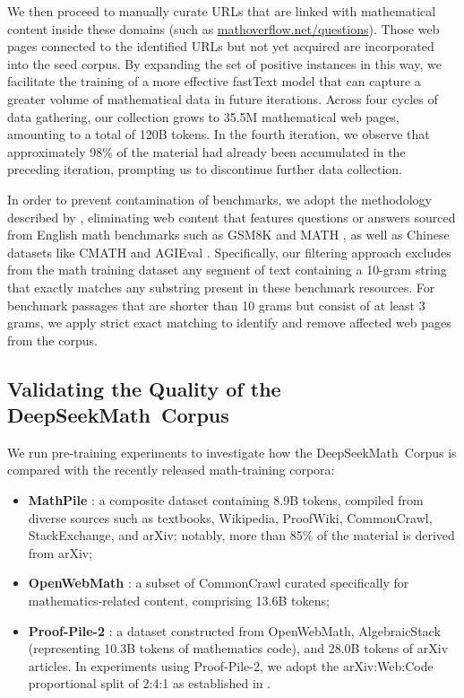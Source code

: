 \begin{itemize}[topsep=0pt]
We then proceed to manually curate URLs that are linked with mathematical content inside these domains (such as \url{mathoverflow.net/questions}). Those web pages connected to the identified URLs but not yet acquired are incorporated into the seed corpus. By expanding the set of positive instances in this way, we facilitate the training of a more effective fastText model that can capture a greater volume of mathematical data in future iterations. Across four cycles of data gathering, our collection grows to 35.5M mathematical web pages, amounting to a total of 120B tokens. In the fourth iteration, we observe that approximately 98\% of the material had already been accumulated in the preceding iteration, prompting us to discontinue further data collection.

In order to prevent contamination of benchmarks, we adopt the methodology described by \cite{deepseek-coder}, eliminating web content that features questions or answers sourced from English math benchmarks such as GSM8K \citep{gsm8k} and MATH \citep{MATH}, as well as Chinese datasets like CMATH \citep{wei2023cmath} and AGIEval \citep{agieval}. Specifically, our filtering approach excludes from the math training dataset any segment of text containing a 10-gram string that exactly matches any substring present in these benchmark resources. For benchmark passages that are shorter than 10 grams but consist of at least 3 grams, we apply strict exact matching to identify and remove affected web pages from the corpus.

\subsection{Validating the Quality of the DeepSeekMath~Corpus}

We run pre-training experiments to investigate how the DeepSeekMath~Corpus is compared with the recently released math-training corpora:

\begin{itemize}[topsep=0pt]
    \item \textbf{MathPile} \citep{mathpile}: a composite dataset containing 8.9B tokens, compiled from diverse sources such as textbooks, Wikipedia, ProofWiki, CommonCrawl, StackExchange, and arXiv; notably, more than 85\% of the material is derived from arXiv;
    \item \textbf{OpenWebMath} \citep{openwebmath}: a subset of CommonCrawl curated specifically for mathematics-related content, comprising 13.6B tokens;
    \item \textbf{Proof-Pile-2} \citep{llemma}: a dataset constructed from OpenWebMath, AlgebraicStack (representing 10.3B tokens of mathematics code), and 28.0B tokens of arXiv articles. In experiments using Proof-Pile-2, we adopt the arXiv:Web:Code proportional split of 2:4:1 as established in \cite{llemma}.
\end{itemize}


\end{itemize}

